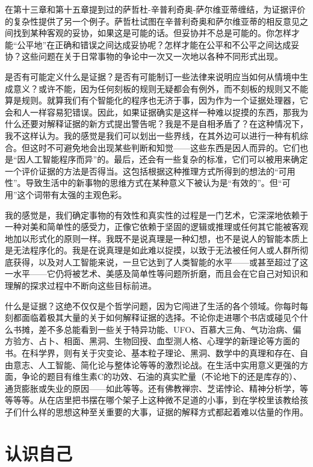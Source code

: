 在第十三章和第十五章提到过的萨哲杜-辛普利奇奥-萨尔维亚蒂缠结，为证据评价的复杂性提供了另一个例子。萨哲杜试图在辛普利奇奥和萨尔维亚蒂的相反意见之间找到某种客观的妥协，如果这是可能的话。但妥协并不总是可能的。你怎样才能“公平地”在正确和错误之间达成妥协呢？怎样才能在公平和不公平之间达成妥协？这些问题在关于日常事物的争论中一次又一次地以各种不同形式出现。

是否有可能定义什么是证据？是否有可能制订一些法律来说明应当如何从情境中生成意义？或许不能，因为任何刻板的规则无疑都会有例外，而不刻板的规则又不能算是规则。就算我们有个智能化的程序也无济于事，因为作为一个证据处理器，它会和人一样容易犯错误。因此，如果证据确实是这样一种难以捉摸的东西，那我为什么还要对解释证据的新方式提出警告呢？我是不是自相矛盾了？在这种情况下，我不这样认为。我的感觉是我们可以划出一些界线，在其外边可以进行一种有机综合。但这时不可避免地会出现某些判断和知觉——这些东西是因人而异的。它们也是“因人工智能程序而异”的。最后，还会有一些复杂的标准，它们可以被用来确定一个评价证据的方法是否得当。这包括根据这种推理方式所得到的想法的“可用性”。导致生活中的新事物的思维方式在某种意义下被认为是“有效的”。但“可用”这个词带有太强的主观色彩。

我的感觉是，我们确定事物的有效性和真实性的过程是一门艺术，它深深地依赖于一种对美和简单性的感受力，正像它依赖于坚固的逻辑或推理或任何其它能被客观地加以形式化的原则一样。我既不是说真理是一种幻想，也不是说人的智能本质上是无法程序化的。我是在说真理是如此难以捉摸，以致于无法被任何人或人群所彻底获得，以及对人工智能来说，一旦它达到了人类智能的水平——或甚至超过了这一水平——它仍将被艺术、美感及简单性等问题所折磨，而且会在它自己对知识和理解的探求过程中不断向这些目标前进。

什么是证据？这绝不仅仅是个哲学问题，因为它闯进了生活的各个领域。你每时每刻都面临着极其大量的关于如何解释证据的选择。不论你走进哪个书店或碰见个什么书摊，差不多总能看到一些关于特异功能、UFO、百慕大三角、气功治病、偏方验方、占卜、相面、黑洞、生物回授、血型测人格、心理学的新理论等方面的书。在科学界，则有关于灾变论、基本粒子理论、黑洞、数学中的真理和存在、自由意志、人工智能、简化论与整体论等等的激烈论战。在生活中实用意义更强的方面，争论的题目有维生素C的功效、石油的真实贮量（不论地下的还是库存的）、通货膨胀或失业的原因——如此等等。还有佛教禅宗、芝诺悖论、精神分析学，等等等等。从在店里把书摆在哪个架子上这种微不足道的小事，到在学校里该教给孩子们什么样的思想这种至关重要的大事，证据的解释方式都起着难以估量的作用。

\section{认识自己}

